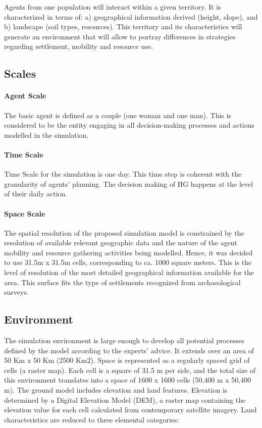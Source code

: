 \documentclass[11pt,oneside,a4paper,openright]{report}
\begin{document}
Agents from one population will interact within a given territory. It is characterized in terms of: a)
geographical information derived (height, slope), and b) landscape (soil types, resources). This
territory and its characteristics will generate an environment that will allow to portray differences in
strategies regarding settlement, mobility and resource use.


\subsection{Scales}
\paragraph{Agent Scale}
The basic agent is defined as a couple (one woman and one man). This is considered to be the entity
engaging in all decision-making processes and actions modelled in the simulation.
\paragraph{Time Scale}
Time Scale for the simulation is one day. This time step is coherent with the granularity of agents’
planning. The decision making of HG happens at the level of their daily action.

\paragraph{Space Scale}

The spatial resolution of the proposed simulation model is constrained by the resolution of available
relevant geographic data and the nature of the agent mobility and resource gathering activities being
modelled.
Hence, it was decided to use 31.5m x 31.5m cells, corresponding to ca. 1000 square meters. This is
the level of resolution of the most detailed geographical information available for the area. This surface
fits the type of settlements recognized from archaeological surveys.


\subsection{Environment}
The simulation environment is large enough to develop all potential processes defined by the model according to the
experts' advice. It extends over an area of 50 Km x 50 Km (2500 Km2). Space is represented as a regularly spaced grid
of cells (a raster map). Each cell is a square of 31.5 m per side, and the total size of this environment
translates into a space of 1600 x 1600 cells (50,400 m x 50,400 m).
The ground model includes elevation and land features. Elevation is determined by a Digital Elevation
Model (DEM), a raster map containing the elevation value for each cell calculated from contemporary
satellite imagery. Land characteristics are reduced to three elemental categories:
\end{document}
